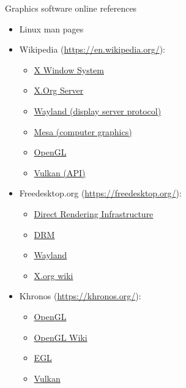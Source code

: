 \begin{frame}{Graphics software online references}
  \small
  \begin{minipage}[t]{0.45\textwidth}
  \begin{itemize}
  \item Linux man pages
  \item Wikipedia (\url{https://en.wikipedia.org/}):
    \begin{itemize}
    \item \href{https://en.wikipedia.org/wiki/X_Window_System}{X Window System}
    \item \href{https://en.wikipedia.org/wiki/X.Org_Server}{X.Org Server}
    \item \href{https://en.wikipedia.org/wiki/Wayland_(display_server_protocol)}{Wayland (display server protocol)}
    \item \href{https://en.wikipedia.org/wiki/Mesa_(computer_graphics)}{Mesa (computer graphics)}
    \item \href{https://en.wikipedia.org/wiki/OpenGL}{OpenGL}
    \item \href{https://en.wikipedia.org/wiki/Vulkan_(API)}{Vulkan (API)}
    \end{itemize}
  \end{itemize}
  \end{minipage}
  \hfill
  \begin{minipage}[t]{0.5\textwidth}
  \begin{itemize}
  \item Freedesktop.org (\url{https://freedesktop.org/}):
    \begin{itemize}
    \item \href{https://dri.freedesktop.org/wiki/}{Direct Rendering Infrastructure}
    \item \href{https://dri.freedesktop.org/wiki/DRM/}{DRM}
    \item \href{https://wayland.freedesktop.org/}{Wayland}
    \item \href{https://www.x.org/wiki/}{X.org wiki}
    \end{itemize}
  \item Khronos (\url{https://khronos.org/}):
    \begin{itemize}
    \item \href{https://www.khronos.org/opengl/}{OpenGL}
    \item \href{https://www.khronos.org/opengl/wiki/}{OpenGL Wiki}
    \item \href{https://www.khronos.org/egl/}{EGL}
    \item \href{https://www.khronos.org/vulkan/}{Vulkan}
    \end{itemize}
  \end{itemize}
  \end{minipage}
\end{frame}

